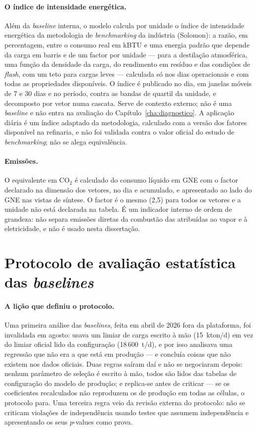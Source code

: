 \paragraph{O índice de intensidade energética.} Além da \emph{baseline}
interna, o modelo calcula por unidade o índice de intensidade energética
da metodologia de \emph{benchmarking} da indústria (Solomon): a razão,
em percentagem, entre o consumo real em kBTU e uma energia padrão que
depende da carga em barris e de um factor por unidade --- para a
destilação atmosférica, uma função da densidade da carga, do rendimento em
resíduo e das condições de \emph{flash}, com um teto para cargas leves ---
calculada só nos dias operacionais e com todas as propriedades disponíveis.
O índice é publicado no dia, em janelas móveis de 7 e 30 dias e no
período, contra as bandas de quartil da unidade, e decomposto por vetor
numa cascata. Serve de contexto externo; não é uma \emph{baseline} e não
entra na avaliação do Capítulo~\ref{cha:diagnostico}. A aplicação diária é
um índice adaptado da metodologia, calculado com a versão dos fatores
disponível na refinaria, e não foi validada contra o valor oficial do
estudo de \emph{benchmarking}; não se alega equivalência.

\paragraph{Emissões.} O equivalente em CO$_2$ é calculado do consumo
líquido em GNE com o factor declarado na dimensão dos vetores, no dia e
acumulado, e apresentado ao lado do GNE nas vistas de síntese. O factor é o
mesmo (2,5) para todos os vetores e a unidade não está declarada na tabela.
É um indicador interno de ordem de grandeza: não separa emissões diretas da
combustão das atribuídas ao vapor e à eletricidade, e não é usado nesta
dissertação.

\section{Protocolo de avaliação estatística das \emph{baselines}}
\label{sec:protocolo-baselines}

\paragraph{A lição que definiu o protocolo.} Uma primeira análise das
\emph{baselines}, feita em abril de 2026 fora da plataforma, foi
invalidada em agosto: usava um limiar de carga escrito à mão (15~kton/d)
em vez do limiar oficial lido da configuração (18\,600~t/d), e por isso
analisava uma regressão que não era a que está em produção --- e concluía
coisas que não existem nos dados oficiais. Duas regras saíram daí e não
se negociaram depois: nenhum parâmetro de seleção é escrito à mão, todos
são lidos das tabelas de configuração do modelo de produção; e replica-se
antes de criticar --- se os coeficientes recalculados não reproduzem os de
produção em todas as células, o protocolo para. Uma terceira regra veio da
revisão externa do protocolo: não se criticam violações de independência
usando testes que assumem independência e apresentando os seus
$p$-values como prova.

